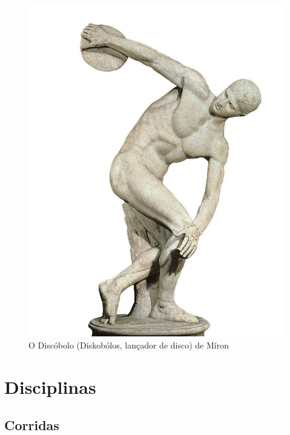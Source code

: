 \documentclass{report}
\begin{document}
     \FloatBarrier
            \begin{figure}[h]
            \center
            \includegraphics[scale=1,angle=0]{estatua.jpg}
            \caption{O Discóbolo (Diskobólos, lançador de disco) de Míron}
            \label{fig:blocos.2}
            \end{figure}
    \FloatBarrier

\chapter{Disciplinas}
\label{chap.Disciplinas}

    \section{Corridas}
\end{document}
